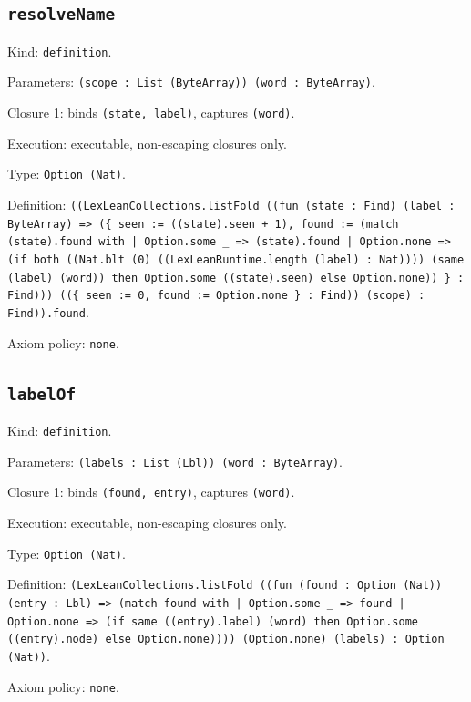 \documentclass[11pt]{article}
\begin{document}
\subsection*{\texttt{resolveName}}
\noindent Kind: \texttt{definition}.\par
\noindent Parameters: \texttt{(scope : List (ByteArray)) (word : ByteArray)}.\par
\noindent Closure 1: binds \texttt{(state, label)}, captures \texttt{(word)}.\par
\noindent Execution: executable, non-escaping closures only.\par
\noindent Type: \texttt{Option (Nat)}.\par
\noindent Definition: \texttt{((LexLeanCollections.listFold ((fun (state : Find) (label : ByteArray) => (\{ seen := ((state).seen + 1), found := (match (state).found with | Option.some \_ => (state).found | Option.none => (if both ((Nat.blt (0) ((LexLeanRuntime.length (label) : Nat)))) (same (label) (word)) then Option.some ((state).seen) else Option.none)) \} : Find))) ((\{ seen := 0, found := Option.none \} : Find)) (scope) : Find)).found}.\par
\noindent Axiom policy: \texttt{none}.\par
\subsection*{\texttt{labelOf}}
\noindent Kind: \texttt{definition}.\par
\noindent Parameters: \texttt{(labels : List (Lbl)) (word : ByteArray)}.\par
\noindent Closure 1: binds \texttt{(found, entry)}, captures \texttt{(word)}.\par
\noindent Execution: executable, non-escaping closures only.\par
\noindent Type: \texttt{Option (Nat)}.\par
\noindent Definition: \texttt{(LexLeanCollections.listFold ((fun (found : Option (Nat)) (entry : Lbl) => (match found with | Option.some \_ => found | Option.none => (if same ((entry).label) (word) then Option.some ((entry).node) else Option.none)))) (Option.none) (labels) : Option (Nat))}.\par
\noindent Axiom policy: \texttt{none}.\par
\end{document}
